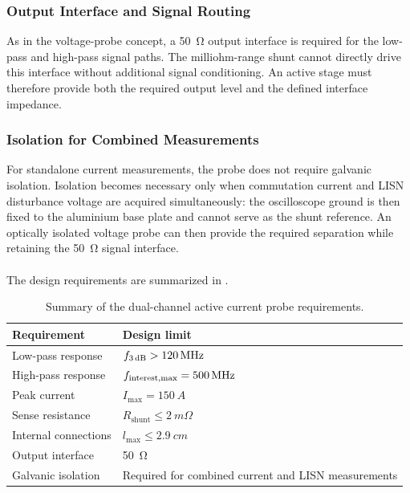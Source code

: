 \subsubsection*{Output Interface and Signal Routing}
As in the voltage-probe concept, a \SI{50}{\ohm} output interface is required for the low-pass and high-pass signal paths.
The milliohm-range shunt cannot directly drive this interface without additional signal conditioning.
An active stage must therefore provide both the required output level and the defined interface impedance.

\subsubsection*{Isolation for Combined Measurements}
For standalone current measurements, the probe does not require galvanic isolation.
Isolation becomes necessary only when commutation current and LISN disturbance voltage are acquired simultaneously: the oscilloscope ground is then fixed to the aluminium base plate and cannot serve as the shunt reference.
An optically isolated voltage probe can then provide the required separation while retaining the \SI{50}{\ohm} signal interface.
\\
\\
The design requirements are summarized in .

\begin{table}[htbp]
\centering
\caption{Summary of the dual-channel active current probe requirements.}
\label{tab:CurrentProbeRequirements}
\renewcommand{\arraystretch}{1.25}
\begin{tabularx}{0.8\textwidth}{>{\raggedright\arraybackslash}p{} >{\centering\arraybackslash}X}
    \toprule
    \textbf{Requirement} & \textbf{Design limit} \\
    \midrule
    Low-pass response & ${f}_{\mathrm{\SI{3}{dB}}}>\SI{120}{MHz}$ \\
    High-pass response & ${f}_{\mathrm{interest,max}} = \SI{500}{MHz}$ \\
    Peak current & $I_{\mathrm{max}}= \SI{150}{A}$ \\
    Sense resistance & $R_{\mathrm{shunt}}\leq\SI{2}{m\Omega}$ \\
    Internal connections & $l_{\max}\leq\SI{2.9}{cm}$ \\
    Output interface & \SI{50}{\ohm} \\
    Galvanic isolation & Required for combined current and LISN measurements \\
    \bottomrule
\end{tabularx}
\end{table}

\FloatBarrier